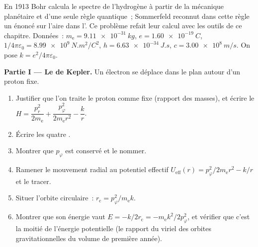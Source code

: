 \begin{problem}\label{pb:b3:hamiltonian-mechanics:1}
En 1913 Bohr calcula le spectre de l'hydrogène à partir de la mécanique
planétaire et d'une seule règle quantique~; Sommerfeld reconnut dans
cette règle un énoncé sur l'aire dans l'. Ce problème
refait leur calcul avec les outils de ce chapitre. Données~: $m_{\text{e}} =
\qty{9.11e-31}{kg}$, $e = \qty{1.60e-19}{C}$, $1/4\pi\varepsilon_0 =
\qty{8.99e9}{N.m^2/C^2}$, $h = \qty{6.63e-34}{J.s}$, $c =
\qty{3.00e8}{m/s}$. On pose $k = e^2/4\pi\varepsilon_0$.

\medskip\noindent\textbf{Partie I --- Le  de Kepler.}
Un électron se déplace dans le plan autour d'un proton fixe.
\begin{enumerate}
  \item Justifier que l'on traite le proton comme fixe (rapport des masses), et écrire
        le  $H = \dfrac{p_r^2}{2m_{\text{e}}} +
        \dfrac{p_\varphi^2}{2m_{\text{e}}r^2} - \dfrac{k}{r}$.
  \item Écrire les quatre .
  \item Montrer que $p_\varphi$ est conservé et le nommer.
  \item Ramener le mouvement radial au potentiel effectif
        $U_{\text{eff}}(r) = p_\varphi^2/2m_{\text{e}}r^2 - k/r$ et
        le tracer.
  \item Situer l'orbite circulaire~: $r_{\text{c}} =
        p_\varphi^2/m_{\text{e}}k$.
  \item Montrer que son énergie vaut $E = -k/2r_{\text{c}} =
        -m_{\text{e}}k^2/2p_\varphi^2$, et vérifier que c'est la moitié
        de l'énergie potentielle (le rapport du viriel des orbites
        gravitationnelles du volume de première année).
\end{enumerate}


\end{problem}
